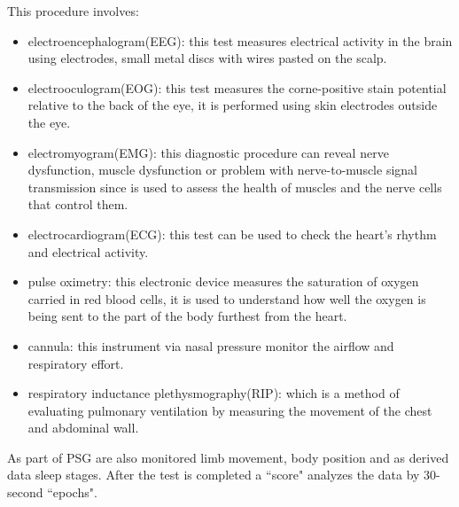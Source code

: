 This procedure involves:
\begin{itemize}
    \item electroencephalogram(EEG)\cite{ElectroencephalogramMedicine}: this test measures electrical activity in the brain using electrodes, small metal discs with wires pasted on the scalp.
    \item electrooculogram(EOG)\cite{CREEL2019495}: this test measures the corne-positive stain potential relative to the back of the eye, it is performed using skin electrodes outside the eye.
    \item electromyogram(EMG)\cite{ElectromyographySite}: this diagnostic procedure can reveal nerve dysfunction, muscle dysfunction or problem with nerve-to-muscle signal transmission since is used to assess the health of muscles and the nerve cells that control them.
    \item electrocardiogram(ECG)\cite{ElectrocardiogramNHS}: this test can be used to check the heart's rhythm and electrical activity.
    \item pulse oximetry\cite{PulseMedicine}: this electronic device measures the saturation of oxygen carried in red blood cells, it is used to understand how well the oxygen is being sent to the part of the body furthest from the heart.
    \item cannula: this instrument via nasal pressure monitor the airflow and respiratory effort\cite{heitman2002validation}.
    \item respiratory inductance plethysmography(RIP)\cite{Brullmann2010RespiratoryCalibration}: which is a method of evaluating pulmonary ventilation by measuring the movement of the chest and abdominal wall.
\end{itemize}
As part of PSG are also monitored limb movement, body position and as derived data sleep stages. 
After the test is completed a ``score" analyzes the data by 30-second ``epochs".

